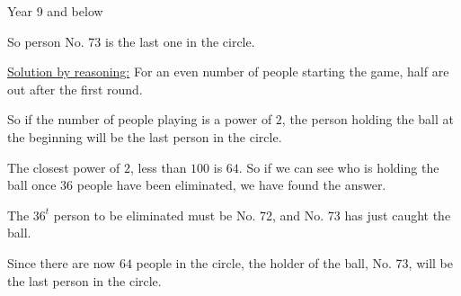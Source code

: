 \begin{MyInnerBox}{Year 9 and below}
{\begin{MySolutionBox}
        So person No. 73 is the last one in the circle.\par
        \underline{Solution by reasoning:} For an even number of people starting the game, half are out after the first round.\par
        So if the number of people playing is a power of \(2\), the person holding the ball at the beginning will be the last person in the circle.\par
        The closest power of \(2\), less than \(100\) is \(64\). So if we can see who is holding the ball once \(36\) people have been eliminated, we have found the answer.\par
        The \(36^{t}\) person to be eliminated must be No. 72, and No. 73 has just caught the ball.\par
        Since there are now \(64\) people in the circle, the holder of the ball, No. 73, will be the last person in the circle.\par
      \end{MySolutionBox}
    }{}%
    \end{MyInnerBox}

